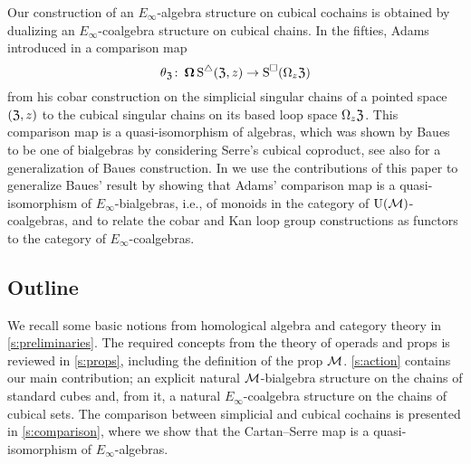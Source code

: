 Our construction of an $E_\infty$-algebra structure on cubical cochains is obtained by dualizing an $E_\infty$-coalgebra structure on cubical chains.
In the fifties, Adams introduced in \cite{adams1956cobar} a comparison map
\[
\theta_{\mathfrak{Z}} \colon \operatorname{\mathbf{\Omega}} \operatorname{\operatorname{S}^{\triangle}}(\mathfrak{Z},z) \to \operatorname{\operatorname{S}^{\square}}(\Omega_z \mathfrak{Z})
\]
from his cobar construction on the simplicial singular chains of a pointed space $(\mathfrak{Z},z)$ to the cubical singular chains on its based loop space $\Omega_z \mathfrak{Z}$.
This comparison map is a quasi-isomorphism of algebras, which was shown by Baues \cite{baues1998hopf} to be one of bialgebras by considering Serre's cubical coproduct, see also \cite{galvez-carrilo202hopf1} for a generalization of Baues construction.
In \cite{medina2021cobar} we use the contributions of this paper to generalize Baues' result by showing that Adams' comparison map is a quasi-isomorphism of $E_\infty$-bialgebras, i.e., of monoids in the category of ${\operatorname{U}(\mathcal{M})}$-coalgebras, and to relate the cobar and Kan loop group constructions as functors to the category of $E_\infty$-coalgebras.

\subsection*{Outline}

We recall some basic notions from homological algebra and category theory in \cref{s:preliminaries}.
The required concepts from the theory of operads and props is reviewed in \cref{s:props}, including the definition of the prop $\mathcal{M}$.
\cref{s:action} contains our main contribution; an explicit natural $\mathcal{M}$-bialgebra structure on the chains of standard cubes and, from it, a natural $E_\infty$-coalgebra structure on the chains of cubical sets.
The comparison between simplicial and cubical cochains is presented in \cref{s:comparison}, where we show that the Cartan--Serre map is a quasi-isomorphism of $E_\infty$-algebras.